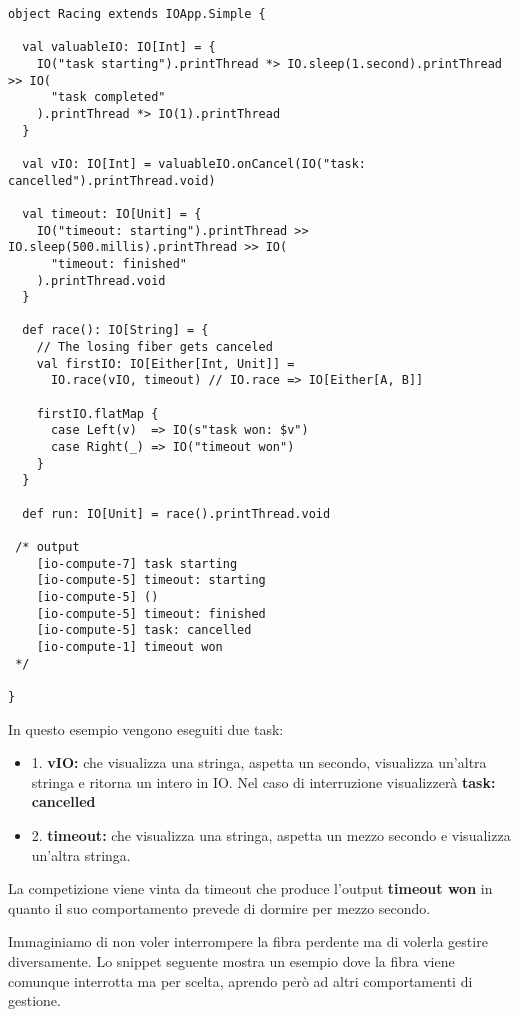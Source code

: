 \begin{verbatim}
object Racing extends IOApp.Simple {

  val valuableIO: IO[Int] = {
    IO("task starting").printThread *> IO.sleep(1.second).printThread >> IO(
      "task completed"
    ).printThread *> IO(1).printThread
  }
  
  val vIO: IO[Int] = valuableIO.onCancel(IO("task: cancelled").printThread.void)
  
  val timeout: IO[Unit] = {
    IO("timeout: starting").printThread >> IO.sleep(500.millis).printThread >> IO(
      "timeout: finished"
    ).printThread.void
  }

  def race(): IO[String] = {
    // The losing fiber gets canceled
    val firstIO: IO[Either[Int, Unit]] =
      IO.race(vIO, timeout) // IO.race => IO[Either[A, B]]

    firstIO.flatMap {
      case Left(v)  => IO(s"task won: $v")
      case Right(_) => IO("timeout won")
    }
  }

  def run: IO[Unit] = race().printThread.void 

 /* output
    [io-compute-7] task starting
    [io-compute-5] timeout: starting
    [io-compute-5] ()
    [io-compute-5] timeout: finished
    [io-compute-5] task: cancelled
    [io-compute-1] timeout won
 */
  
}

\end{verbatim}

\noindent In questo esempio vengono eseguiti due task:
\begin{itemize}
    \item 1. \textbf{vIO:} che visualizza una stringa, aspetta un secondo, visualizza un’altra stringa e ritorna un intero in IO. Nel caso di interruzione visualizzerà \textbf{task: cancelled}
    \item 2. \textbf{timeout:} che visualizza una stringa, aspetta un mezzo secondo e visualizza un’altra stringa.
\end{itemize}

\noindent La competizione viene vinta da timeout che produce l'output \textbf{timeout won} in quanto il suo comportamento prevede di dormire per mezzo secondo.

Immaginiamo di non voler interrompere la fibra perdente ma di volerla gestire diversamente. Lo snippet seguente mostra un esempio dove la fibra viene comunque interrotta ma per scelta, aprendo però ad altri comportamenti di gestione. 

